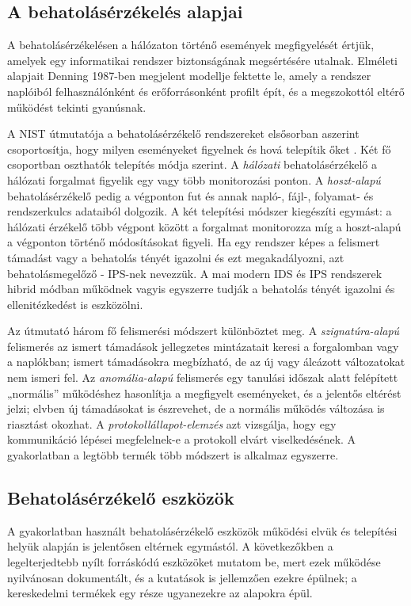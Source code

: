 \subsection{A behatolásérzékelés alapjai}\label{sec:ids-alapok}
A behatolásérzékelésen a hálózaton történő események megfigyelését értjük, amelyek egy informatikai rendszer biztonságának megsértésére utalnak. Elméleti alapjait Denning 1987-ben megjelent modellje fektette le, amely a rendszer naplóiból felhasználónként és erőforrásonként profilt épít, és a megszokottól eltérő működést tekinti gyanúsnak. \cite{denning1987}

A \ac{NIST} útmutatója a behatolásérzékelő rendszereket elsősorban aszerint csoportosítja, hogy milyen eseményeket figyelnek és hová telepítik őket \cite{scarfone2007nist}. Két fő csoportban oszthatók telepítés módja szerint. A \emph{hálózati} behatolásérzékelő a hálózati forgalmat figyelik egy vagy több monitorozási ponton. A \emph{hoszt-alapú} behatolásérzékelő pedig a végponton fut és annak napló-, fájl-, folyamat- és rendszerkulcs adataiból dolgozik. A két telepítési módszer kiegészíti egymást: a hálózati érzékelő több végpont között a forgalmat monitorozza míg a hoszt-alapú a végponton történő módosításokat figyeli. Ha egy rendszer képes a felismert támadást vagy a behatolás tényét igazolni és ezt megakadályozni, azt behatolásmegelőző - \ac{IPS}-nek nevezzük. A mai modern \ac{IDS} és \ac{IPS} rendszerek hibrid módban működnek vagyis egyszerre tudják a behatolás tényét igazolni és ellenitézkedést is eszközölni.

Az útmutató három fő felismerési módszert különböztet meg. A \emph{szignatúra-alapú} felismerés az ismert támadások jellegzetes mintázatait keresi a forgalomban vagy a naplókban; ismert támadásokra megbízható, de az új vagy álcázott változatokat nem ismeri fel. Az \emph{anomália-alapú} felismerés egy tanulási időszak alatt felépített „normális” működéshez hasonlítja a megfigyelt eseményeket, és a jelentős eltérést jelzi; elvben új támadásokat is észrevehet, de a normális működés változása is riasztást okozhat. A \emph{protokollállapot-elemzés} azt vizsgálja, hogy egy kommunikáció lépései megfelelnek-e a protokoll elvárt viselkedésének. A gyakorlatban a legtöbb termék több módszert is alkalmaz egyszerre.

\subsection{Behatolásérzékelő eszközök}\label{sec:ids-eszkozok}
A gyakorlatban használt behatolásérzékelő eszközök működési elvük és telepítési helyük alapján is jelentősen eltérnek egymástól.
A következőkben a legelterjedtebb nyílt forráskódú eszközöket mutatom be, mert ezek működése nyilvánosan dokumentált, és a kutatások is jellemzően ezekre épülnek; a kereskedelmi termékek egy része ugyanezekre az alapokra épül.

